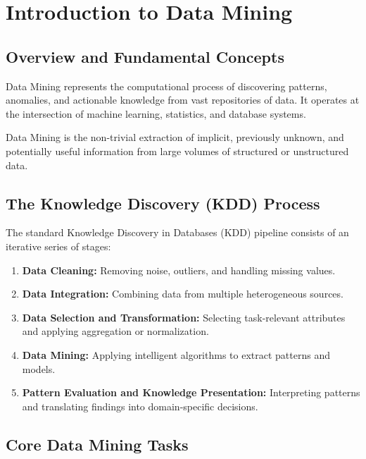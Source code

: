 \chapter{Introduction to Data Mining}
\label{ch:introduction-to-data-mining}

\section{Overview and Fundamental Concepts}

Data Mining represents the computational process of discovering patterns, anomalies, and actionable knowledge from vast repositories of data. It operates at the intersection of machine learning, statistics, and database systems.

\begin{definition}
Data Mining is the non-trivial extraction of implicit, previously unknown, and potentially useful information from large volumes of structured or unstructured data.
\end{definition}

\section{The Knowledge Discovery (KDD) Process}

The standard Knowledge Discovery in Databases (KDD) pipeline consists of an iterative series of stages:
\begin{enumerate}
    \item \textbf{Data Cleaning:} Removing noise, outliers, and handling missing values.
    \item \textbf{Data Integration:} Combining data from multiple heterogeneous sources.
    \item \textbf{Data Selection and Transformation:} Selecting task-relevant attributes and applying aggregation or normalization.
    \item \textbf{Data Mining:} Applying intelligent algorithms to extract patterns and models.
    \item \textbf{Pattern Evaluation and Knowledge Presentation:} Interpreting patterns and translating findings into domain-specific decisions.
\end{enumerate}

\section{Core Data Mining Tasks}

